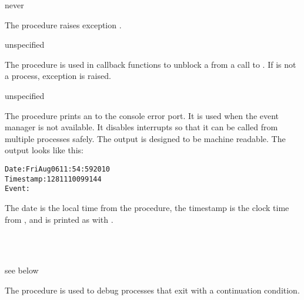 \begin{procedure}
\end{procedure}
\returns{} never

The  procedure raises exception .

\begin{procedure}
\end{procedure}
\returns{} unspecified

The  procedure is used in callback functions to
unblock a  from a call to . If
 is not a process, exception  is raised.

\begin{procedure}
\end{procedure}
\returns{} unspecified

The  procedure prints an  to
the console error port. It is used when the event manager is not
available. It disables interrupts so that it can be called from
multiple processes safely.  The output is designed to be machine
readable. The output looks like this:

\begin{alltt}
Date: Fri Aug 06 11:54:59 2010
Timestamp: 1281110099144
Event: 
\end{alltt}

The date is the local time from the  procedure,
the timestamp is the clock time from , and
 is printed as with .

\begin{procedure}
  \\
  \\
  \strut
\end{procedure}
\returns{} see below

The  procedure is used to debug processes that exit with a
continuation condition.


